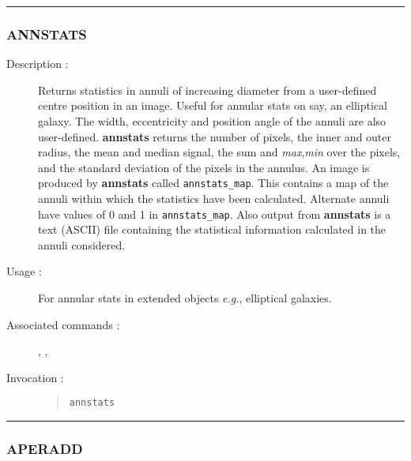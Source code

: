 \hrule 
\subsubsection*{\label{ANNSTATS}ANNSTATS}

\begin{description}

\item[Description :] Returns statistics in annuli of increasing
diameter from a user-defined centre position in an image.  Useful for
annular stats on say, an elliptical galaxy.  The width, eccentricity
and position angle of the annuli are also user-defined.  {\bf annstats}
returns the number of pixels, the inner and outer radius, the mean and
median signal, the sum and {\it max},{\it min} over the pixels, and the
standard deviation of the pixels in the annulus. An image is produced
by {\bf annstats} called {\tt annstats\_map}.  This contains a map of
the annuli within which the statistics have been calculated. Alternate
annuli have values of 0 and 1 in {\tt annstats\_map}. Also output from
{\bf annstats} is a text (ASCII) file containing the statistical
information calculated in the annuli considered.

\item[Usage :] For annular stats in extended objects \emph{e.g.},
elliptical galaxies.

\item[Associated commands :] {\tt {}}, 
{\tt {}}, {\tt {}}

\item[Invocation :]

\begin{quote}{\tt  annstats }\end{quote}

\end{description}

\hrule 
\subsubsection*{\label{APERADD}APERADD}

